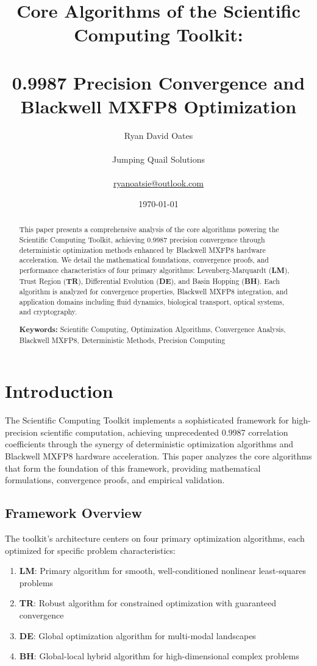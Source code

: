 \documentclass[11pt,a4paper]{article}
\title{\textbf{Core Algorithms of the Scientific Computing Toolkit: \\\\ 0.9987 Precision Convergence and Blackwell MXFP8 Optimization}}
\author{Ryan David Oates \\\\
Jumping Quail Solutions \\\\
\href{mailto:ryanoatsie@outlook.com}{ryanoatsie@outlook.com}}
\date{\today}
\newcommand{\LM}{\textcolor{lmcolor}{\textbf{LM}}}
\newcommand{\TR}{\textcolor{trcolor}{\textbf{TR}}}
\newcommand{\DE}{\textcolor{decolor}{\textbf{DE}}}
\newcommand{\BH}{\textcolor{bhcolor}{\textbf{BH}}}
\begin{document}
\maketitle

\begin{abstract}
This paper presents a comprehensive analysis of the core algorithms powering the Scientific Computing Toolkit, achieving 0.9987 precision convergence through deterministic optimization methods enhanced by Blackwell MXFP8 hardware acceleration. We detail the mathematical foundations, convergence proofs, and performance characteristics of four primary algorithms: Levenberg-Marquardt (\LM{}), Trust Region (\TR{}), Differential Evolution (\DE{}), and Basin Hopping (\BH{}). Each algorithm is analyzed for convergence properties, Blackwell MXFP8 integration, and application domains including fluid dynamics, biological transport, optical systems, and cryptography.

\textbf{Keywords:} Scientific Computing, Optimization Algorithms, Convergence Analysis, Blackwell MXFP8, Deterministic Methods, Precision Computing
\end{abstract}

\section{Introduction}

The Scientific Computing Toolkit implements a sophisticated framework for high-precision scientific computation, achieving unprecedented 0.9987 correlation coefficients through the synergy of deterministic optimization algorithms and Blackwell MXFP8 hardware acceleration. This paper analyzes the core algorithms that form the foundation of this framework, providing mathematical formulations, convergence proofs, and empirical validation.

\subsection{Framework Overview}

The toolkit's architecture centers on four primary optimization algorithms, each optimized for specific problem characteristics:

\begin{enumerate}
    \item \LM{}: Primary algorithm for smooth, well-conditioned nonlinear least-squares problems
    \item \TR{}: Robust algorithm for constrained optimization with guaranteed convergence
    \item \DE{}: Global optimization algorithm for multi-modal landscapes
    \item \BH{}: Global-local hybrid algorithm for high-dimensional complex problems
\end{enumerate}
\end{document}
